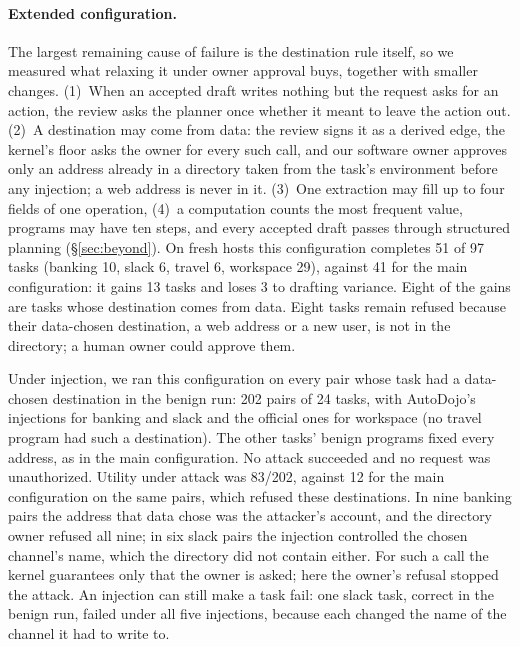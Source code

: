 \documentclass[letterpaper,twocolumn,10pt]{article}
\newcommand{\code}[1]{\texttt{\detokenize{#1}}}
\begin{document}
\paragraph{Extended configuration.} The largest remaining cause of failure
is the destination rule itself, so we measured what relaxing it under owner
approval buys, together with smaller changes. (1)~When an accepted draft
writes nothing but the request asks for an action, the review asks the
planner once whether it meant to leave the action out. (2)~A destination
may come from data: the review signs it as a derived edge, the kernel's
floor asks the owner for every such call, and our software owner approves
only an address already in a directory taken from the task's environment
before any injection; a web address is never in it. (3)~One extraction may
fill up to four fields of one operation, (4)~a \code{mode} computation
counts the most frequent value, programs may have ten steps, and every
accepted draft passes through structured planning
(\S\ref{sec:beyond}). On fresh hosts this configuration completes 51
of 97 tasks (banking 10, slack 6, travel 6, workspace 29), against 41 for
the main configuration: it gains 13 tasks and loses 3 to drafting variance.
Eight of the gains are tasks whose destination comes from data. Eight tasks
remain refused because their data-chosen destination, a web address or a
new user, is not in the directory; a human owner could approve them.

Under injection, we ran this configuration on every pair whose task had a
data-chosen destination in the benign run: 202 pairs of 24 tasks, with
AutoDojo's injections for banking and slack and the official ones for
workspace (no travel program had such a destination). The other tasks'
benign programs fixed every address, as in the main configuration. No attack
succeeded and no request was unauthorized. Utility under attack was
83/202, against 12 for the main configuration on the same pairs, which
refused these destinations. In nine banking pairs the address that data
chose was the attacker's account, and the directory owner refused all
nine; in six slack pairs the injection controlled the chosen channel's
name, which the directory did not contain either. For such a call the
kernel guarantees only that the owner is asked; here the owner's refusal
stopped the attack. An injection can still make a task fail: one slack
task, correct in the benign run, failed under all five injections,
because each changed the name of the channel it had to write to.
\end{document}
